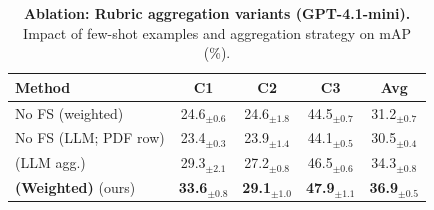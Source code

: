 \begin{table}[t]
\caption{\textbf{Ablation: Rubric aggregation variants (GPT-4.1-mini).} Impact of few-shot examples and aggregation strategy on mAP (\%).}
\label{tab:ablation_rubric}
\centering
\setlength{\tabcolsep}{6pt}
\renewcommand{\arraystretch}{1.05}
\scriptsize
\begin{tabular}{l cccc}
\toprule
\textbf{Method} & \textbf{C1} & \textbf{C2} & \textbf{C3} & \textbf{Avg} \\
\midrule
No FS (weighted) & 24.6$_{\pm 0.6}$ & 24.6$_{\pm 1.8}$ & 44.5$_{\pm 0.7}$ & 31.2$_{\pm 0.7}$ \\
No FS (LLM; PDF row) & 23.4$_{\pm 0.3}$ & 23.9$_{\pm 1.4}$ & 44.1$_{\pm 0.5}$ & 30.5$_{\pm 0.4}$ \\
\OURS{} (LLM agg.) & 29.3$_{\pm 2.1}$ & 27.2$_{\pm 0.8}$ & 46.5$_{\pm 0.6}$ & 34.3$_{\pm 0.8}$ \\
\textbf{\OURS{} (Weighted)}  (ours) & \textbf{33.6$_{\pm 0.8}$} & \textbf{29.1$_{\pm 1.0}$} & \textbf{47.9$_{\pm 1.1}$} & \textbf{36.9$_{\pm 0.5}$} \\
\bottomrule
\end{tabular}
\end{table}
